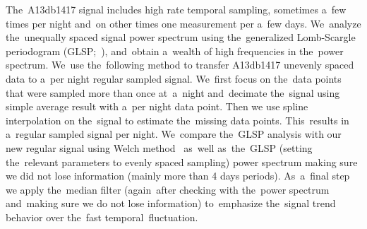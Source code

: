 \documentclass[galaxies,article,accept,moreauthors,pdftex]{mdpi}
\begin{document}
The~A13db1417 signal includes high rate temporal sampling, sometimes a~few times per night and~on other times one measurement per a~few days. We~analyze the~unequally spaced signal power spectrum using the~generalized Lomb-Scargle periodogram (GLSP;~\cite{ZechmeisterKurster2009}), and~obtain a~wealth of high frequencies in the~power spectrum. We~use the~following method to transfer A13db1417 unevenly spaced data to a~per night regular sampled signal. We~first focus on the~data points that were sampled more than once at~a~night and~decimate the~signal using simple average result with a~per night data point. Then we use spline interpolation on the~signal to estimate the~missing data points. This~results in a~regular sampled signal per night. We~compare the~GLSP analysis with our new regular signal using Welch method~\citep{Welch1967} as~well as~the~GLSP (setting the~relevant parameters to evenly spaced sampling) power spectrum making sure we did not lose information (mainly more than 4 days periods).  As~a~final step we apply the~median filter (again~after checking with the~power spectrum and~making sure we do not lose information) to~emphasize the~signal trend behavior over the~fast temporal~fluctuation.
\end{document}
